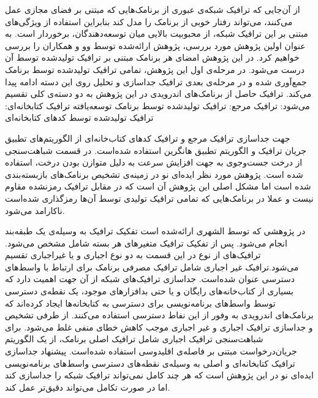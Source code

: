 از آن‌جایی که ترافیک شبکه‌ی عبوری از برنامک‌هایی که مبتنی بر فضای مجازی عمل می‌کنند، می‌تواند رفتار خوبی از برنامک را مدل کند بنابراین استفاده از ویژگی‌های مبتنی بر این ترافیک شبکه، از محبوبیت بالایی میان توسعه‌دهندگان، برخوردار است. به عنوان اولین پژوهش مورد بررسی، پژوهش ارائه‌شده توسط وو و همکاران  را بررسی خواهیم کرد. در این پژوهش امضا‌ی هر برنامک مبتنی بر ترافیک  تولیدشده توسط آن درست می‌شود. در مرحله‌ی اول این پژوهش، تمامی ترافیک‌ تولید‌شده توسط برنامک جمع‌آوری شده و در مرحله‌ی بعدی ترافیک  جداسازی و تحلیل روی این دسته ادامه پیدا می‌کند. ترافیک حاصل از برنامک‌های اندرویدی در این پژوهش به دو دسته‌ی کلی تقسیم می‌شود:
 ترافیک مرجع‌: ترافیک تولید‌شده توسط برنامک توسعه‌یافته
 ترافیک کتابخانه‌ای: ترافیک تولید‌شده توسط کد‌های کتابخانه‌ای

جهت جداسازی ترافیک مرجع و ترافیک کد‌های کتاب‌خانه‌ای از الگوریتم‌های تطبیق جریان ترافیک‌  و الگوریتم تطبیق هانگرین‌ استفاده شده‌است. در قسمت شباهت‌سنجی از درخت جست‌وجوی  به جهت افزایش سرعت به دلیل متوازن بودن درخت، استفاده شده ‌است. پژوهش مورد نظر ایده‌ای نو در زمینه‌ی تشخیص برنامک‌های بازبسته‌بندی شده است اما مشکل اصلی این پژوهش آن است که در مقابل ترافیک رمز‌نشده مقاوم نیست و عملا در برنامک‌هایی که تمامی ترافیک تولیدی توسط آن‌ها رمزگذاری شده‌است ناکارامد می‌شود.

در پژوهشی که توسط الشهری ارائه‌شده است تفکیک ترافیک به وسیله‌ی یک طبقه‌بند انجام می‌‌شود. پس از تفکیک ترافیک متغیر‌های هر بسته شامل  مشخص‌ می‌شود. ترافیک‌های از نوع  در این قسمت به دو نوع اجباری و یا غیراجباری تقسیم می‌شود.ترافیک غیر اجباری شامل ترافیک مصرفی برنامک برای ارتباط با واسط‌های دسترسی عنوان شده‌است. جداسازی ترافیک‌های شبکه از آن‌ جهت اهمیت دارد که بسیاری از کتاب‌خانه‌های رایگان و یا حتی بدافزار‌های موجود، یک نقطه‌ی دسترسی‌ توسط واسط‌های برنامه‌نویسی برای دسترسی به کتابخانه‌ها ایجاد کرده‌اند که برنامک‌های اندرویدی به وفور از این نفاط دسترسی استفاده می‌کنند. از طرفی تشخیص و جداسازی ترافیک اجباری و غیر اجباری موجب کاهش خطای منفی غلط می‌شود. برای شباهت‌سنجی ترافیک اجباری شامل ترافیک اصلی برنامک، از یک الگوریتم جریان‌درخواست‌ مبتنی بر فاصله‌ی اقلیدوسی‌ استفاده شده‌است. پیشنهاد جداسازی ترافیک کتابخانه‌ای و اصلی به وسیله‌ی نقطه‌های دسترسی واسط‌های برنامه‌نویسی ایده‌ای نو در این پژوهش است که هر چند کامل نمی‌تواند ترافیک‌ شبکه را جداسازی کند اما در صورت تکامل می‌تواند دقیق‌تر عمل کند.

